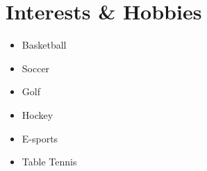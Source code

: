 \documentclass[letterpaper,11pt]{article}
\begin{document}
\section{Interests \& Hobbies}
\begin{multicols}{2}
\begin{itemize}
\item Basketball
\item Soccer
\item Golf
\item Hockey
\item E-sports
\item Table Tennis
\end{itemize}
\end{multicols}
\end{document}
